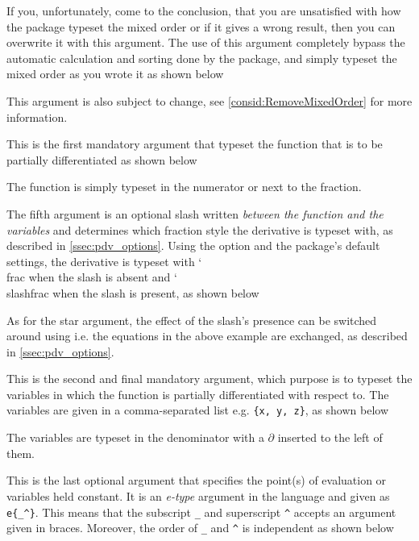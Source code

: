 \documentclass[final,british,10pt]{scrartcl}
\theoremstyle{remark}
\DeclareRobustCommand\cs[1]{{\CommonFont \char`\\#1}}
\begin{document}
If you, unfortunately, come to the conclusion, that you are unsatisfied with how the package typeset the mixed order or if it gives a wrong result, then you can overwrite it with this argument. The use of this argument completely bypass the automatic calculation and sorting done by the package, and simply typeset the mixed order as you wrote it as shown below


\noindent This argument is also subject to change, see \cref{consid:RemoveMixedOrder} for more information.

This is the first mandatory argument that typeset the function that is to be partially differentiated as shown below


\noindent The function is simply typeset in the numerator or next to the fraction.

The fifth argument is an optional slash written \emph{between the function and the variables} and determines which fraction style the derivative is typeset with, as described in \cref{ssec:pdv_options}. Using the option  and the package's default settings, the derivative is typeset with \cs{frac} when the slash is absent and \cs{slashfrac} when the slash is present, as shown below


\noindent As for the star argument, the effect of the slash's presence can be switched around using  i.e. the equations in the above example are exchanged, as described in \cref{ssec:pdv_options}.

This is the second and final mandatory argument, which purpose is to typeset the variables in which the function is partially differentiated with respect to. The variables are given in a comma-separated list e.g. \texttt{\{x, y, z\}}, as shown below


\noindent The variables are typeset in the denominator with a $\partial$ inserted to the left of them.

This is the last optional argument that specifies the point(s) of evaluation or variables held constant.
It is an \emph{e-type} argument in the  language and given as \verb|e{_^}|. This means that the
subscript \verb|_| and superscript \verb|^| accepts an argument given in braces. Moreover, the order
of \verb|_| and \verb|^| is independent as shown below
\end{document}
